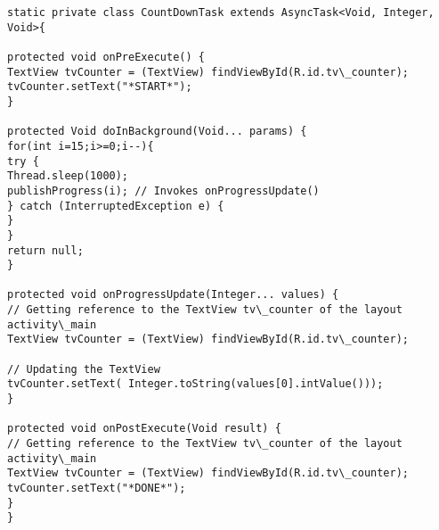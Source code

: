 \begin{lstlisting}
static private class CountDownTask extends AsyncTask<Void, Integer, Void>{

protected void onPreExecute() {
TextView tvCounter = (TextView) findViewById(R.id.tv\_counter);
tvCounter.setText("*START*");
}

protected Void doInBackground(Void... params) {
for(int i=15;i>=0;i--){
try {
Thread.sleep(1000);
publishProgress(i); // Invokes onProgressUpdate()
} catch (InterruptedException e) {
}
}
return null;
}

protected void onProgressUpdate(Integer... values) {
// Getting reference to the TextView tv\_counter of the layout activity\_main
TextView tvCounter = (TextView) findViewById(R.id.tv\_counter);

// Updating the TextView 
tvCounter.setText( Integer.toString(values[0].intValue()));			
}

protected void onPostExecute(Void result) {
// Getting reference to the TextView tv\_counter of the layout activity\_main
TextView tvCounter = (TextView) findViewById(R.id.tv\_counter);
tvCounter.setText("*DONE*");			
}		
}
\end{lstlisting}

